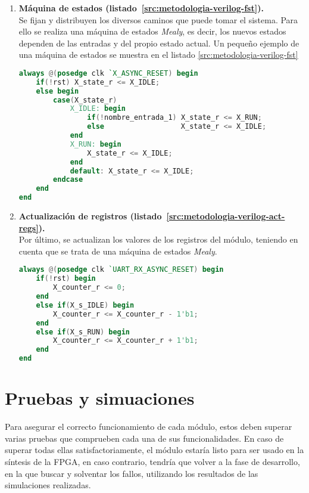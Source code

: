 \begin{enumerate}
    \item{\textbf{Máquina de estados (listado~\ref{src:metodologia-verilog-fst}).}} \\
    Se fijan y distribuyen los diversos caminos que puede tomar el sistema. Para ello se realiza una máquina de estados \emph{Mealy}\cite{mealy1955method}, es decir, los nuevos estados dependen de las entradas y del propio estado actual. Un pequeño ejemplo de una máquina de estados se muestra en el listado \ref{src:metodologia-verilog-fst}
    \begin{lstlisting}[language=Verilog,
        caption={Ejemplo de máquina de estados.},
        label=src:metodologia-verilog-fst]
always @(posedge clk `X_ASYNC_RESET) begin
    if(!rst) X_state_r <= X_IDLE;
    else begin
        case(X_state_r)
            X_IDLE: begin
                if(!nombre_entrada_1) X_state_r <= X_RUN;
                else                  X_state_r <= X_IDLE;
            end
            X_RUN: begin
                X_state_r <= X_IDLE;
            end
            default: X_state_r <= X_IDLE;
        endcase
    end
end
    \end{lstlisting}

    \item{\textbf{Actualización de registros (listado~\ref{src:metodologia-verilog-act-regs}).}} \\
    Por último, se actualizan los valores de los registros del módulo, teniendo en cuenta que se trata de una máquina de estados \emph{Mealy}\cite{barkalov2005design}.
    \begin{lstlisting}[language=Verilog,
        caption={Ejemplo de actualización de registros.},
        label=src:metodologia-verilog-act-regs]
always @(posedge clk `UART_RX_ASYNC_RESET) begin
    if(!rst) begin
        X_counter_r <= 0;
    end
    else if(X_s_IDLE) begin
        X_counter_r <= X_counter_r - 1'b1;
    end
    else if(X_s_RUN) begin
        X_counter_r <= X_counter_r + 1'b1;
    end
end
    \end{lstlisting}
\end{enumerate}



\section{Pruebas y simuaciones}
\label{ch:contribuciones:pruebas}
Para asegurar el correcto funcionamiento de cada módulo, estos deben superar varias pruebas que comprueben cada una de sus funcionalidades. En caso de superar todas ellas satisfactoriamente, el módulo estaría listo para ser usado en la síntesis de la FPGA, en caso contrario, tendría que volver a la fase de desarrollo, en la que buscar y solventar los fallos, utilizando los resultados de las simulaciones realizadas.

